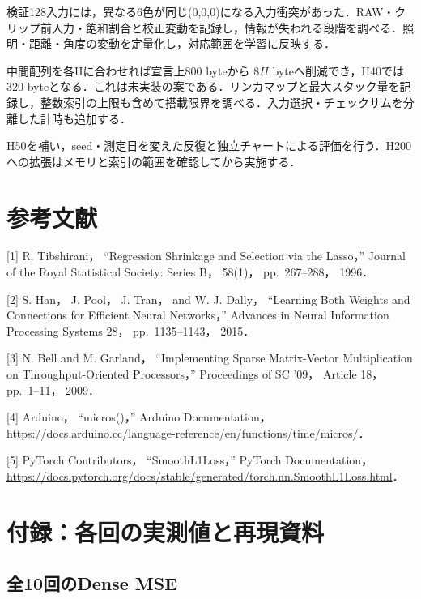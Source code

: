 \documentclass[
  10pt,
  a4paper,
]{article}
\begin{document}
検証128入力には，異なる6色が同じ(0,0,0)になる入力衝突があった．RAW・クリップ前入力・飽和割合と校正変動を記録し，情報が失われる段階を調べる．照明・距離・角度の変動を定量化し，対応範囲を学習に反映する．

中間配列を各Hに合わせれば宣言上800 byteから \(8H\)
byteへ削減でき，H40では320
byteとなる．これは未実装の案である．リンカマップと最大スタック量を記録し，整数索引の上限も含めて搭載限界を調べる．入力選択・チェックサムを分離した計時も追加する．

H50を補い，seed・測定日を変えた反復と独立チャートによる評価を行う．H200への拡張はメモリと索引の範囲を確認してから実施する．

\section{参考文献}\label{ux53c2ux8003ux6587ux732e}

{[}1{]} R. Tibshirani， ``Regression Shrinkage and Selection via the
Lasso，'' Journal of the Royal Statistical Society: Series B， 58(1)，
pp.~267--288， 1996．

{[}2{]} S. Han， J. Pool， J. Tran， and W. J. Dally， ``Learning Both
Weights and Connections for Efficient Neural Networks，'' Advances in
Neural Information Processing Systems 28， pp.~1135--1143， 2015．

{[}3{]} N. Bell and M. Garland， ``Implementing Sparse Matrix-Vector
Multiplication on Throughput-Oriented Processors，'' Proceedings of SC
'09， Article 18， pp.~1--11， 2009．

{[}4{]} Arduino， ``micros()，'' Arduino Documentation，
\url{https://docs.arduino.cc/language-reference/en/functions/time/micros/}．

{[}5{]} PyTorch Contributors， ``SmoothL1Loss，'' PyTorch
Documentation，
\url{https://docs.pytorch.org/docs/stable/generated/torch.nn.SmoothL1Loss.html}．

\section{付録：各回の実測値と再現資料}\label{ux4ed8ux9332ux5404ux56deux306eux5b9fux6e2cux5024ux3068ux518dux73feux8cc7ux6599}


\subsection{全10回のDense MSE}\label{ux516810ux56deux306edense-mse}
\end{document}

